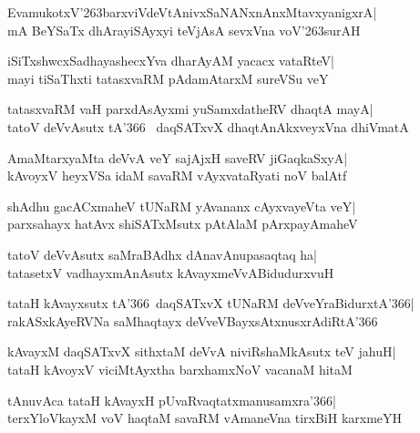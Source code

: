 \documentclass[twoside,12pt,openright]{book}
\def\S{\char'263}
\newcounter{shloka}[chapter]
\begin{document}
\begin{shloka}%
EvamukotxV\S barxviVdeVtAnivxSaNANxnAnxMtavxyanigxrA|\\
mA BeYSaTx dhArayiSAyxyi teVjAsA sevxVna voV\S surAH
\end{shloka}

\begin{shloka}%
iSiTxshwcxSadhayashecxYva dharAyAM yacacx vataRteV|\\
mayi tiSaThxti tatasxvaRM pAdamAtarxM sureVSu veY
\end{shloka}

\begin{shloka}%
tatasxvaRM vaH parxdAsAyxmi yuSamxdatheRV dhaqtA mayA|\\
tatoV deVvAsutx tA\char'366 \ daqSATxvX  dhaqtAnAkxveyxVna dhiVmatA
\end{shloka}

\begin{shloka}%
AmaMtarxyaMta deVvA veY sajAjxH saveRV jiGaqkaSxyA|\\
kAvoyxV heyxVSa idaM savaRM vAyxvataRyati noV balAtf
\end{shloka}

\begin{shloka}%
shAdhu gacACxmaheV tUNaRM yAvananx cAyxvayeVta veY|\\
parxsahayx hatAvx shiSATxMsutx pAtAlaM pArxpayAmaheV
\end{shloka}

\begin{shloka}%
tatoV deVvAsutx saMraBAdhx dAnavAnupasaqtaq ha|\\
tatasetxV vadhayxmAnAsutx kAvayxmeVvABidudurxvuH
\end{shloka}

\begin{shloka}%
tataH kAvayxsutx tA\char'366\ daqSATxvX tUNaRM
deVveYraBidurxtA\char'366|\\
rakASxkAyeRVNa saMhaqtayx deVveVBayxsAtxnusxrAdiRtA\char'366
\end{shloka}

\begin{shloka}%
kAvayxM daqSATxvX sithxtaM deVvA niviRshaMkAsutx teV jahuH|\\
tataH kAvoyxV viciMtAyxtha barxhamxNoV vacanaM hitaM
\end{shloka}

\begin{shloka}%
tAnuvAca tataH kAvayxH pUvaRvaqtatxmanusamxra\char'366|\\
terxYloVkayxM voV haqtaM savaRM vAmaneVna tirxBiH karxmeYH
\end{shloka}
\end{document}
